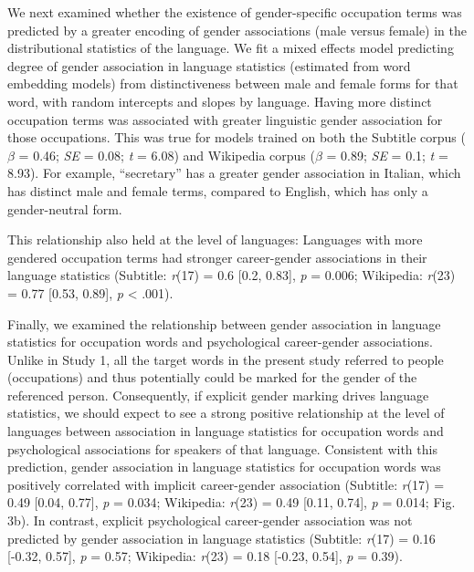 \documentclass[11pt]{wlscirep}
\begin{document}
We next examined whether the existence of gender-specific occupation terms was predicted by a greater encoding of gender associations (male versus female) in the distributional statistics of the language. We fit a mixed effects model predicting degree of gender association in language statistics (estimated from word embedding models) from distinctiveness between male and female forms for that word, with random intercepts and slopes by language. Having more distinct occupation terms was associated with greater linguistic gender association for those occupations. This was true for models trained on both the Subtitle corpus (\(\beta\) = 0.46; \emph{SE} = 0.08; \emph{t} = 6.08) and Wikipedia
corpus (\(\beta\) = 0.89; \emph{SE} = 0.1; \emph{t} = 8.93). For example, \enquote{secretary} has a greater gender association in Italian, which has distinct male and female terms, compared to English, which has only a gender-neutral form.

This relationship also held at the level of languages: Languages with more
gendered occupation terms had stronger career-gender associations in their language statistics
(Subtitle: \emph{r}(17) = 0.6 {[}0.2, 0.83{]}, \emph{p} = 0.006; Wikipedia: \emph{r}(23) = 0.77 {[}0.53, 0.89{]}, \emph{p} \textless{} .001).

Finally, we examined the relationship between gender association in language
statistics for occupation words and psychological career-gender associations. Unlike in Study 1, all the target words in the present study referred to
people (occupations) and thus potentially could be marked for the gender
of the referenced person. Consequently, if explicit gender marking
drives language statistics, we should expect to see a strong positive
relationship at the level of languages between association in language
statistics for occupation words and psychological associations for
speakers of that language. Consistent with this prediction, gender association
in language statistics for occupation words was positively correlated
with implicit career-gender association (Subtitle: \emph{r}(17) = 0.49 {[}0.04, 0.77{]}, \emph{p} = 0.034; Wikipedia: \emph{r}(23) = 0.49 {[}0.11, 0.74{]}, \emph{p} = 0.014; Fig. 3b). In contrast,  explicit psychological career-gender association was not predicted by gender association in language statistics (Subtitle: \emph{r}(17) = 0.16 {[}-0.32, 0.57{]}, \emph{p} = 0.57; Wikipedia: \emph{r}(23) = 0.18 {[}-0.23, 0.54{]}, \emph{p} = 0.39).
\end{document}
